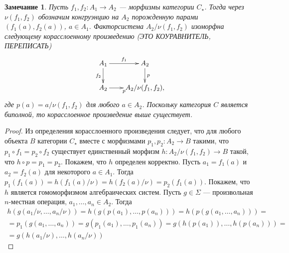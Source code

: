 \documentclass[a4paper,12pt]{article}
\newtheorem{remark}{Замечание}
\begin{document}
\begin{remark}\label{factor}
    Пусть $f_1, f_2: A_1 \to A_2$ --- морфизмы категории $C_\star$. Тогда через $\nu(f_1,f_2)$ обозначим конгруэнцию на $A_2$ порожденную парами $(f_1(a),f_2(a))$, $a \in A_1$. Факторсистема $A_2/\nu(f_1,f_2)$ изоморфна следующему корасслоенному произведению (ЭТО КОУРАВНИТЕЛЬ, ПЕРЕПИСАТЬ)
    $$\xymatrix@R=2em@C=2em{
        A_1 \ar[r]^{f_1} \ar[d]_{f_2} & A_2 \ar[d]^{p}\\
        A_2 \ar[r]_{p} & A_2/\nu(f_1,f_2),
    }$$
    где $p(a) = a/\nu(f_1,f_2)$ для любого $a \in A_2$. Поскольку категория $C$ является биполной, то корасслоенное произведение выше существует. 
\end{remark}
\begin{proof}
    Из определения корасслоенного произведения следует, что для любого объекта $B$ категории $C_\star$ вместе с морфизмами $p_1, p_2: A_2 \to B$ такими, что $p_1 \circ f_1 = p_2 \circ f_2$ существует единственный морфизм $h: A_2/\nu(f_1,f_2) \to B$ такой, что $h \circ p = p_1 = p_2$. Покажем, что $h$ определен корректно. Пусть $a_1 = f_1(a)$ и $a_2 = f_2(a)$ для некоторого $a \in A_1$. Тогда $p_1(f_1(a)) = h(f_1(a)/\nu) = h(f_2(a)/\nu) = p_2(f_1(a))$. Покажем, что $h$ является гомоморфизмом алгебраических систем. Пусть $g \in \Sigma$ --- произвольная $n$-местная операция, $a_1,\ldots,a_n \in A_2$. Тогда 
    \begin{multline*}
        h(g(a_1/\nu,\ldots,a_n/\nu)) = h(g(p(a_1),\ldots,p(a_n))) = h(p(g(a_1,\ldots,a_n))) =\\=
        p_1(g(a_1,\ldots,a_n)) = g(p_1(a_1),\ldots,p_1(a_n)) = g(h(p(a_1)),\ldots,h(p(a_n))) =\\=
        g(h(a_1/\nu),\ldots,h(a_n/\nu))
    \end{multline*}
\end{proof}
\end{document}
